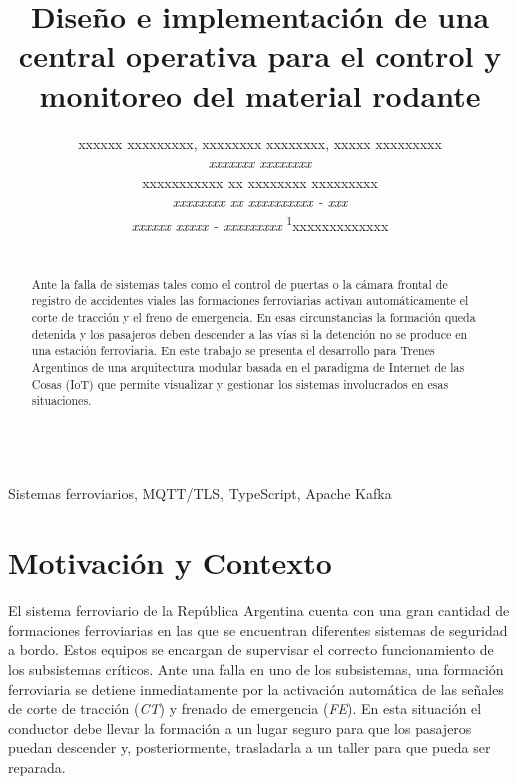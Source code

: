 \documentclass[a4paper]{IEEEtran}
\begin{document}
\title{Diseño e implementación de una central operativa para el control y monitoreo del material rodante}



\author{

xxxxxx xxxxxxxxx, 
xxxxxxxx xxxxxxxx, 
xxxxx xxxxxxxxx \\

\normalsize \textit{xxxxxxx xxxxxxxx} \\
xxxxxxxxxxx xx xxxxxxxx xxxxxxxxx \\
\textit{xxxxxxxx xx xxxxxxxxxx - xxx} \\
\textit{xxxxxx xxxxx - xxxxxxxxx}
\textsuperscript{1}\small xxxxxxxxxxxxx \\

}


\maketitle

\begin{abstract}
\\
Ante la falla de sistemas tales como el control de puertas o la cámara frontal de registro de accidentes viales las formaciones ferroviarias activan automáticamente el corte de tracción y el freno de emergencia. En esas circunstancias la formación queda detenida y los pasajeros deben descender a las vías si la detención no se produce en una estación ferroviaria. En este trabajo se presenta el desarrollo para Trenes Argentinos de una arquitectura modular basada en el paradigma de Internet de las Cosas (IoT) que permite visualizar y gestionar los sistemas involucrados en esas situaciones.
\end{abstract}


\begin{IEEEkeywords}
\\
Sistemas ferroviarios, MQTT/TLS, TypeScript, Apache Kafka
\end{IEEEkeywords}


\section{Motivación y Contexto}

El sistema ferroviario de la República Argentina cuenta con una gran cantidad de formaciones ferroviarias en las que se encuentran diferentes sistemas de seguridad a bordo. Estos equipos se encargan de supervisar el correcto funcionamiento de los subsistemas críticos. Ante una falla en uno de los subsistemas, una formación ferroviaria se detiene inmediatamente por la activación automática de las señales de corte de tracción (\textit{CT}) y frenado de emergencia (\textit{FE}). En esta situación el conductor debe llevar la formación a un lugar seguro para que los pasajeros puedan descender y, posteriormente, trasladarla a un taller para que pueda ser reparada.
\end{document}
